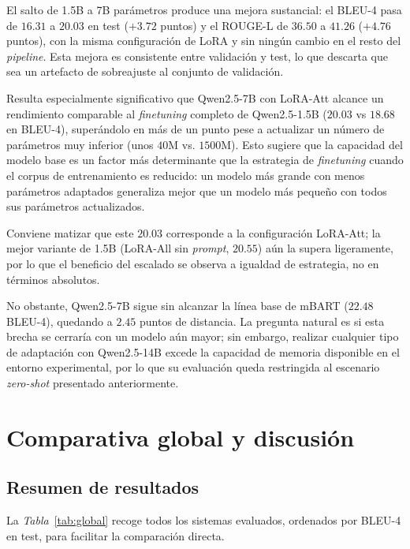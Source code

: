 El salto de 1.5B a 7B parámetros produce una mejora sustancial: el BLEU-4 pasa de $16.31$ a $20.03$ en test ($+3.72$ puntos) y el ROUGE-L de $36.50$ a $41.26$ ($+4.76$ puntos), con la misma configuración de LoRA y sin ningún cambio en el resto del \textit{pipeline}.
Esta mejora es consistente entre validación y test, lo que descarta que sea un artefacto de sobreajuste al conjunto de validación.

Resulta especialmente significativo que Qwen2.5-7B con LoRA-Att alcance un rendimiento comparable al \textit{finetuning} completo de Qwen2.5-1.5B ($20.03$ vs $18.68$ en BLEU-4), superándolo en más de un punto pese a actualizar un número de parámetros muy inferior (unos $40$M vs. $1500$M).
Esto sugiere que la capacidad del modelo base es un factor más determinante que la estrategia de \textit{finetuning} cuando el corpus de entrenamiento es reducido: un modelo más grande con menos parámetros adaptados generaliza mejor que un modelo más pequeño con todos sus parámetros actualizados.

Conviene matizar que este $20.03$ corresponde a la configuración LoRA-Att; la mejor variante de 1.5B (LoRA-All sin \textit{prompt}, $20.55$) aún la supera ligeramente, por lo que el beneficio del escalado se observa a igualdad de estrategia, no en términos absolutos.

No obstante, Qwen2.5-7B sigue sin alcanzar la línea base de mBART ($22.48$ BLEU-4), quedando a $2.45$ puntos de distancia.
La pregunta natural es si esta brecha se cerraría con un modelo aún mayor; sin embargo, realizar cualquier tipo de adaptación con Qwen2.5-14B excede la capacidad de memoria disponible en el entorno experimental, por lo que su evaluación queda restringida al escenario \textit{zero-shot} presentado anteriormente.


\section{Comparativa global y discusión}

\subsection{Resumen de resultados}

La \textit{Tabla}~\ref{tab:global} recoge todos los sistemas evaluados, ordenados por BLEU-4 en test, para facilitar la comparación directa.

